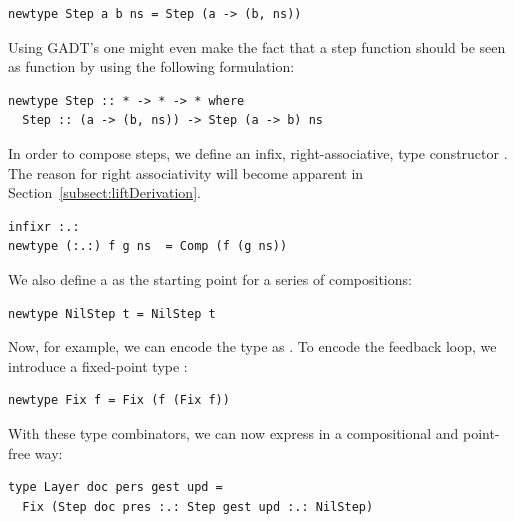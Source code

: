 \documentclass[preprint,natbib]{sigplanconf}
\begin{document}
\begin{small}
\begin{verbatim}
newtype Step a b ns = Step (a -> (b, ns))
\end{verbatim}
\end{small}

\bc
Using GADT's one might even make the fact that a step function should be seen as function by using the following formulation:

\begin{small}
\begin{verbatim}
newtype Step :: * -> * -> * where
  Step :: (a -> (b, ns)) -> Step (a -> b) ns
\end{verbatim}
\end{small}
\ec

In order to compose steps, we define an infix, right-associative, type constructor .
The reason for right associativity will become apparent in Section~\ref{subsect:liftDerivation}.

\begin{small}
\begin{verbatim}
infixr :.:
newtype (:.:) f g ns  = Comp (f (g ns))
\end{verbatim}
\end{small}

We also define a  as the starting point for a series of compositions:

\begin{small}
\begin{verbatim}
newtype NilStep t = NilStep t
\end{verbatim}
\end{small}

Now, for example, we can encode the type  as
. To encode the feedback loop, we introduce a fixed-point type :

\begin{small}
\begin{verbatim}
newtype Fix f = Fix (f (Fix f))
\end{verbatim}
\end{small}

With these type combinators, we can now express  in a compositional and point-free way:

\begin{small}
\begin{verbatim}
type Layer doc pers gest upd = 
  Fix (Step doc pres :.: Step gest upd :.: NilStep)
\end{verbatim}
\end{small}
\end{document}
